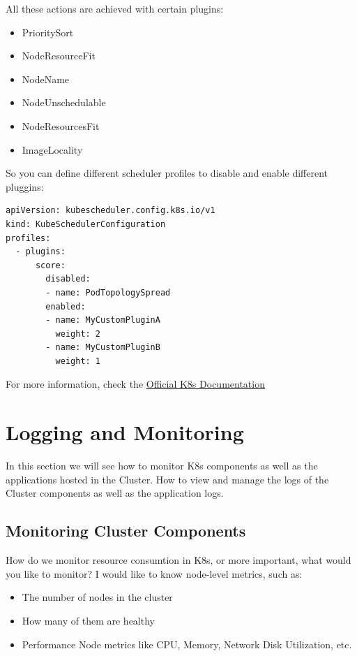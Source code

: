 \documentclass{article}
\newenvironment{codetemplate}[1][]{%
  \mybasecolorbox[#1]
  \itshape
}{%
  \endmybasecolorbox
}
\begin{document}
All these actions are achieved with certain plugins:
\begin{itemize}
    \item PrioritySort
    \item NodeResourceFit
    \item NodeName
    \item NodeUnschedulable
    \item NodeResourcesFit
    \item ImageLocality
\end{itemize}

So you can define different scheduler profiles to disable and enable different pluggins:

\begin{codetemplate}{}
\begin{verbatim}
apiVersion: kubescheduler.config.k8s.io/v1
kind: KubeSchedulerConfiguration
profiles:
  - plugins:
      score:
        disabled:
        - name: PodTopologySpread
        enabled:
        - name: MyCustomPluginA
          weight: 2
        - name: MyCustomPluginB
          weight: 1
\end{verbatim}
\end{codetemplate}

For more information, check the \href{https://kubernetes.io/docs/reference/scheduling/config/}{Official K8s Documentation}


\newpage
\section{Logging and Monitoring}

In this section we will see how to monitor K8s components as well as the applications hosted in the Cluster. How to view and manage the logs of the Cluster components as well as the application logs.

\subsection{Monitoring Cluster Components}

How do we monitor resource consumtion in K8s, or more important, what would you like to monitor? I would like to know node-level metrics, such as:
\begin{itemize}
    \item The number of nodes in the cluster
    \item How many of them are healthy
    \item Performance Node metrics like CPU, Memory, Network Disk Utilization, etc.
\end{itemize}
\end{document}
